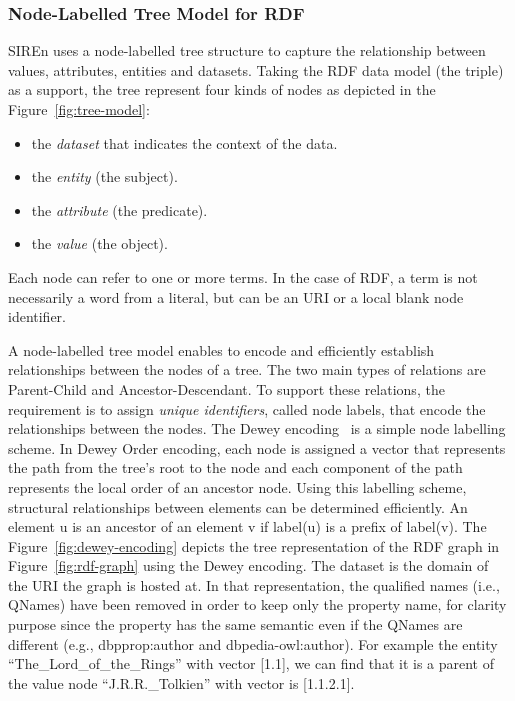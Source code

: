 \subsubsection{Node-Labelled Tree Model for RDF}

SIREn uses a node-labelled tree structure to capture the relationship between
values, attributes, entities and datasets. Taking the RDF data model (the
triple) as a support, the tree represent four kinds of nodes as depicted in the
Figure~\ref{fig:tree-model}:
\begin{itemize}
  \item the \emph{dataset} that indicates the context of the data.
  \item the \emph{entity} (the subject).
  \item the \emph{attribute} (the predicate).
  \item the \emph{value} (the object).
\end{itemize}
Each node can refer to one or more terms. In the case of RDF, a term is not
necessarily a word from a literal, but can be an URI or a local blank node
identifier.

A node-labelled tree model enables to encode and efficiently establish
relationships between the nodes of a tree. The two main types of relations are
Parent-Child and Ancestor-Descendant. To support these relations, the
requirement is to assign \emph{unique identifiers}, called node labels, that
encode the relationships between the nodes. The Dewey
encoding~\cite{beyer:2002:ordered-xml} is a simple node labelling scheme. In
Dewey Order encoding, each node is assigned a vector that represents the path
from the tree’s root to the node and each component of the path represents the
local order of an ancestor node. Using this labelling scheme, structural
relationships between elements can be determined efficiently. An element u is
an ancestor of an element v if label(u) is a prefix of label(v). The
Figure~\ref{fig:dewey-encoding} depicts the tree representation of the RDF
graph in Figure~\ref{fig:rdf-graph} using the Dewey encoding. The dataset is
the domain of the URI the graph is hosted at. In that representation, the
qualified names (i.e., QNames) have been removed in order to keep only the
property name, for clarity purpose since the property has the same semantic
even if the QNames are different (e.g., dbpprop:author and dbpedia-owl:author).
For example the entity ``The\_Lord\_of\_the\_Rings'' with vector [1.1], we can
find that it is a parent of the value node ``J.R.R.\_Tolkien'' with vector is
[1.1.2.1].

